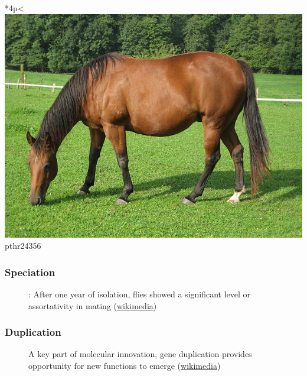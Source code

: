 \documentclass[aspectratio=169, 10pt]{beamer}\usepackage[]{graphicx}\usepackage[]{color}
\begin{document}
\begin{frame}
\begin{table}
\begin{tabular}{*{4}{p{\tmpwidth}<\centering}}
\includegraphics[width=1\linewidth]{horse.jpg} \linebreak pthr24356
\end{tabular}
\end{table}


\end{frame}

\begin{frame}
\frametitle{Speciation}
\begin{figure}
\centering
\def\svgwidth{.8\linewidth}
\tiny

\caption{: After one year of isolation, flies showed a significant level or assortativity in mating (\href{https://commons.wikimedia.org/wiki/File:Drosophila_speciation_experiment.svg}{wikimedia})}
\end{figure}
\end{frame}

\begin{frame}
\frametitle{Duplication}
\begin{figure}
\centering
\def\svgwidth{.6\linewidth}
\tiny

\caption{A key part of molecular innovation, gene duplication provides opportunity for new functions to emerge (\href{https://en.wikipedia.org/wiki/File:Evolution_fate_duplicate_genes_-_vector.svg}{wikimedia})}
\end{figure}
\end{frame}
\end{document}

